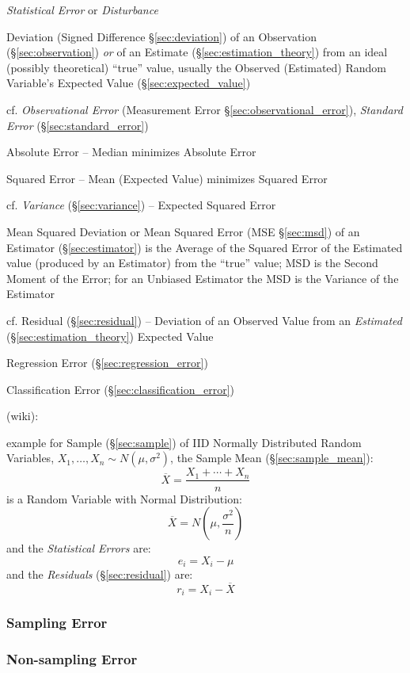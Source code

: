 \emph{Statistical Error} or \emph{Disturbance}

Deviation (Signed Difference \S\ref{sec:deviation}) of an Observation
(\S\ref{sec:observation}) \emph{or} of an Estimate
(\S\ref{sec:estimation_theory}) from an ideal (possibly theoretical) ``true''
value, usually the Observed (Estimated) Random Variable's Expected Value
(\S\ref{sec:expected_value})

\fist cf. \emph{Observational Error} (Measurement Error
\S\ref{sec:observational_error}), \emph{Standard Error}
  (\S\ref{sec:standard_error})

Absolute Error -- Median minimizes Absolute Error

Squared Error -- Mean (Expected Value) minimizes Squared Error

cf. \emph{Variance} (\S\ref{sec:variance}) -- Expected Squared Error

\fist Mean Squared Deviation or Mean Squared Error (MSE \S\ref{sec:msd}) of an
Estimator (\S\ref{sec:estimator}) is the Average of the Squared Error of the
Estimated value (produced by an Estimator) from the ``true'' value; MSD is
the Second Moment of the Error; for an Unbiased Estimator the MSD is the
Variance of the Estimator

cf. Residual (\S\ref{sec:residual}) -- Deviation of an Observed Value from an
\emph{Estimated} (\S\ref{sec:estimation_theory}) Expected Value

\fist Regression Error (\S\ref{sec:regression_error})

\fist Classification Error (\S\ref{sec:classification_error})

(wiki):

example for Sample (\S\ref{sec:sample}) of IID Normally Distributed Random
Variables, $X_1, \ldots, X_n \sim N(\mu, \sigma^2)$, the Sample Mean
(\S\ref{sec:sample_mean}):
\[
  \overline{X} = \frac{X_1 + \cdots + X_n}{n}
\]
is a Random Variable with Normal Distribution:
\[
  \overline{X} = N(\mu, \frac{\sigma^2}{n})
\]
and the \emph{Statistical Errors} are:
\[
  e_i = X_i - \mu
\]
and the \emph{Residuals} (\S\ref{sec:residual}) are:
\[
  r_i = X_i - \overline{X}
\]



\subsubsection{Sampling Error}\label{sec:sampling_error}

\subsubsection{Non-sampling Error}\label{sec:nonsampling_error}

